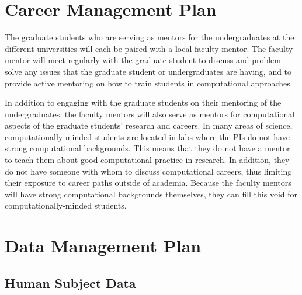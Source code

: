 \documentclass{proposalnsf}
\begin{document}
\section{Career Management Plan}

The graduate students who are serving as mentors for the
undergraduates at the different universities will each be paired with
a local faculty mentor. The faculty mentor will meet regularly with
the graduate student to discuss and problem solve any issues that the
graduate student or undergraduates are having, and to provide active
mentoring on how to train students in computational approaches.

In addition to engaging with the graduate students on their mentoring
of the undergraduates, the faculty mentors will also serve as
mentors for computational aspects of the graduate students' research
and careers. In many areas of science, computationally-minded students
are located in labs where the PIs do not have strong computational
backgrounds. This means that they do not have a mentor to teach them
about good computational practice in research. In addition, they do
not have someone with whom to discuss computational careers, thus limiting
their exposure to career paths outside of academia. Because the
faculty mentors will have strong computational backgrounds themselves,
they can fill this void for computationally-minded students.

\appendix

\newpage
{}
\renewcommand{\thepage} {\footnotesize References\,---\,\arabic{page}}





\newpage
{}
\renewcommand{\thepage} {\footnotesize Data Management\,---\,\arabic{page}}

\section*{Data Management Plan}

\subsection*{Human Subject Data}
\end{document}
